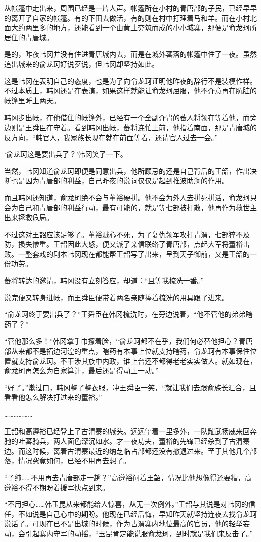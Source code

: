 从帐篷中走出来，周围已经是一片人声。帐篷所在小村的青唐部的子民，已经早早的离开了自家的帐篷。有的下田去做活，有的则在村中打理着马和羊。而在小村北面大约两里多的地方，还能看到一个由黄土夯筑而成的小小城寨，那便是俞龙珂所居住的青唐城。

是的，昨夜韩冈并没有住进青唐城内去，而是在城外蕃落的帐篷中住了一夜。虽然追出城来的俞龙珂好说歹说，但韩冈却坚持如此。

这是韩冈在表明自己的态度，也是为了向俞龙珂证明他昨夜的辞行不是装模作样。不过本质上，韩冈还是在表演，如果这样就能让俞龙珂屈服，他不介意再在肮脏的帐篷里睡上两天。

韩冈步出帐，在他借住的帐篷外，已经有一个全副介胄的蕃人将领在等着他，而旁边则是王舜臣在守着。看到韩冈出帐，蕃将连忙上前，他指着南面，那是青唐城的反方向，“韩官人，我家族长现在就在前面等着，还请官人过去一会。”

‘俞龙珂这是要出兵了？’韩冈笑了一下。

当然，韩冈知道俞龙珂即便是同意出兵，他所顾忌的还是自己背后的王韶，作出决断也是因为青唐部的利益，自己昨夜的说词仅仅是起到推波助澜的作用。

而且韩冈还知道，俞龙珂绝不会与董裕硬拼。他不会为外人去拼死拼活，俞龙珂只会为自己和青唐部的利益行动，最有可能的，就是等七部被打散，他再作为救世主出来拯救危局。

不过这对王韶应该足够了。董裕贼心不死，为了复仇领军攻打青渭，七部猝不及防，损失惨重。王韶因此大怒，便又派了亲信联络了青唐部，点起大军将董裕击败。一整套戏的剧本韩冈现在都能帮王韶写了出来，呈到天子御前，又是王韶的一份功劳。

蕃将转达的邀请，韩冈没有立刻答应，却道：“且等我梳洗一番。”

说完便又转身进帐，而王舜臣便带着两名亲随捧着梳洗的用具跟了进来。

“俞龙珂终于要出兵了？”王舜臣在韩冈梳洗时，在旁边说着，“他不管他的弟弟瞎药了？”

“管他那么多！”韩冈拿手巾擦着脸，“俞龙珂都不在乎，我们何必替他担心？青唐部从来都不是拓边河湟的重点，瞎药有本事上位就支持瞎药，俞龙珂有本事保住位置就支持俞龙珂。不干涉其族中内政，谁上台还不都得老老实实做人。就如现在，俞龙珂再怎么为自家算计，最后还是得动上一动。”

“好了。”漱过口，韩冈整了整衣服，冲王舜臣一笑，“就让我们去跟俞族长汇合，且看看他怎么解决打过来的董裕。”

………………

王韶和高遵裕已经登上了古渭寨的城头。远远望着一里多外，一队耀武扬威来回奔驰的吐蕃骑兵，两人面色深沉如水。才一夜功夫，董裕的先锋已经杀到了古渭寨边。而这时候，离着古渭寨最近的纳芝临占部都还没有撤退过来。至于其他几个部落，情况究竟如何，已经不用再去想了。

“子纯……不用再去青唐部走一趟？”高遵裕问着王韶，情况比他想像得还要糟，高遵裕不得不期盼着援军快点到来。

“不用担心……韩玉昆从来都能给人惊喜，从无一次例外。”王韶与其说是对韩冈的信任，不如说是自己心中的期盼。他现在已经后悔，早知昨天就坚持连夜去找俞龙珂说话了。可现在已不是出城的时候，作为古渭寨内地位最高的官员，他的轻举妄动，会引起寨内守军的动摇，“玉昆肯定能说服俞龙珂，到时就是我们来反击了。”

